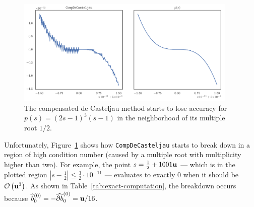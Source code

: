 \begin{figure}
  \includegraphics[width=0.9375\textwidth]{../images/k-compensated/compensated_insufficient.pdf}
  \centering
  \captionsetup{width=.75\linewidth}
  \caption{The compensated de Casteljau method starts to lose accuracy
    for \(p(s) = (2s - 1)^3 (s - 1)\) in the neighborhood of its
    multiple root \(1/2\).}
  \label{fig:compensated-insufficient}
\end{figure}

Unfortunately, Figure~\ref{fig:compensated-insufficient} shows how
\texttt{CompDeCasteljau} starts to break down in a region of
high condition number (caused by a multiple root with multiplicity
higher than two). For example, the point
\(s = \frac{1}{2} + 1001\mathbf{u}\)
--- which is in the plotted region \(\left|s - \frac{1}{2}\right|
\leq \frac{3}{2} \cdot 10^{-11}\) --- evaluates to exactly \(0\) when
it should be \(\mathcal{O}\left(\mathbf{u}^3\right)\). As shown in
Table~\ref{tab:exact-computation}, the breakdown occurs because
\(\widehat{b}_0^{(0)} = -\cdb{1}_0^{(0)} = \mach / 16\).

